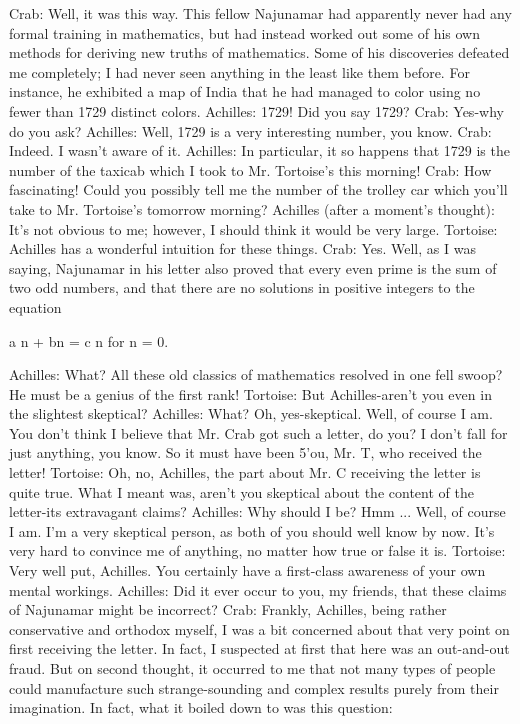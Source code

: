 {Crab: Well, it was this way. This fellow Najunamar had apparently never had any formal
  training in mathematics, but had instead worked out some of his own methods for
  deriving new truths of mathematics. Some of his discoveries defeated me completely;
  I had never seen anything in the least like them before. For instance, he exhibited a
  map of India that he had managed to color using no fewer than 1729 distinct colors.
Achilles: 1729! Did you say 1729? Crab: Yes-why do you ask?
Achilles: Well, 1729 is a very interesting number, you know. Crab: Indeed. I wasn't
  aware of it.
Achilles: In particular, it so happens that 1729 is the number of the taxicab which I took
  to Mr. Tortoise's this morning!
Crab: How fascinating! Could you possibly tell me the number of the trolley car which
  you'll take to Mr. Tortoise's tomorrow morning?
Achilles (after a moment's thought): It's not obvious to me; however, I should think it
  would be very large.
Tortoise: Achilles has a wonderful intuition for these things.
Crab: Yes. Well, as I was saying, Najunamar in his letter also proved that every even
  prime is the sum of two odd numbers, and that there are no solutions in positive
  integers to the equation

                                  a n + bn = c n   for n = 0.

Achilles: What? All these old classics of mathematics resolved in one fell swoop? He
  must be a genius of the first rank! Tortoise: But Achilles-aren't you even in the
  slightest skeptical?
Achilles: What? Oh, yes-skeptical. Well, of course I am. You don't think I believe that
  Mr. Crab got such a letter, do you? I don't fall for just anything, you know. So it must
  have been 5'ou, Mr. T, who received the letter!
Tortoise: Oh, no, Achilles, the part about Mr. C receiving the letter is quite true. What I
  meant was, aren't you skeptical about the content of the letter-its extravagant claims?
Achilles: Why should I be? Hmm ... Well, of course I am. I'm a very skeptical person, as
  both of you should well know by now. It's very hard to convince me of anything, no
  matter how true or false it is.
Tortoise: Very well put, Achilles. You certainly have a first-class awareness of your own
  mental workings.
Achilles: Did it ever occur to you, my friends, that these claims of Najunamar might be
  incorrect?
Crab: Frankly, Achilles, being rather conservative and orthodox myself, I was a bit
  concerned about that very point on first receiving the letter. In fact, I suspected at first
  that here was an out-and-out fraud. But on second thought, it occurred to me that not
  many types of people could manufacture such strange-sounding and complex results
  purely from their imagination. In fact, what it boiled down to was this question:




}
